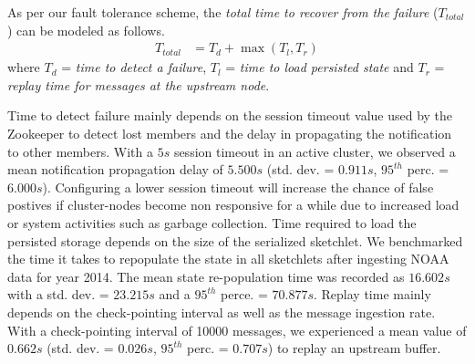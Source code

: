 As per our fault tolerance scheme, the \textit{total time to recover from the failure} ($T_{total}$) can be modeled as follows.
\begin{align*}
    T_{total} &= T_{d} + \max{(T_{l}, T_{r})}      
\end{align*}
where $T_{d}$ = \textit{time to detect a failure}, $T_{l}$ = \textit{time to load persisted state} and $T_{r}$ = \textit{replay time for messages at the upstream node}.

Time to detect failure mainly depends on the session timeout value used by the Zookeeper to detect lost members and the delay in propagating the notification to other members. With a $5s$ session timeout in an active cluster, we observed a mean notification propagation delay of $5.500s$ (std. dev. = $0.911s$, $95^{th}$ perc. = $6.000s$). Configuring a lower session timeout will increase the chance of false postives if cluster-nodes become non responsive for a while due to increased load or system activities such as garbage collection. Time required to load the persisted storage depends on the size of the serialized sketchlet. We benchmarked the time it takes to repopulate the state in all sketchlets after ingesting NOAA data for year 2014. The mean state re-population time was recorded as $16.602s$ with a std. dev. = $23.215s$ and a $95^{th}$ perce. = $70.877s$. Replay time mainly depends on the check-pointing interval as well as the message ingestion rate. With a check-pointing interval of 10000 messages, we experienced a mean value of $0.662s$ (std. dev. = $0.026s$, $95^{th}$ perc. = $0.707s$) to replay an upstream buffer.  														


